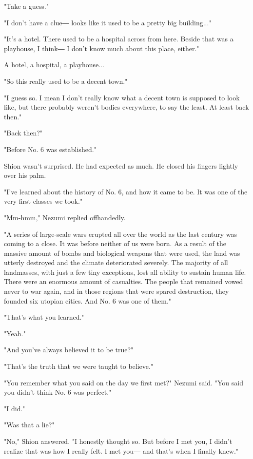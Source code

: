 "Take a guess."

"I don't have a clue― looks like it used to be a pretty big building..."

"It's a hotel. There used to be a hospital across from here. Beside that
was a playhouse, I think― I don't know much about this place, either."

A hotel, a hospital, a playhouse...

"So this really used to be a decent town."

"I guess so. I mean I don't really know what a decent town is supposed
to look like, but there probably weren't bodies everywhere, to say the
least. At least back then."

"Back then?"

"Before No. 6 was established."

Shion wasn't surprised. He had expected as much. He closed his fingers
lightly over his palm.

"I've learned about the history of No. 6, and how it came to be. It was
one of the very first classes we took."

"Mm-hmm," Nezumi replied offhandedly.

"A series of large-scale wars erupted all over the world as the last
century was coming to a close. It was before neither of us were born. As
a result of the massive amount of bombs and biological weapons that were
used, the land was utterly destroyed and the climate deteriorated
severely. The majority of all landmasses, with just a few tiny
exceptions, lost all ability to sustain human life. There were an
enormous amount of casualties. The people that remained vowed never to
war again, and in those regions that were spared destruction, they
founded six utopian cities. And No. 6 was one of them."

"That's what you learned."

"Yeah."

"And you've always believed it to be true?"

"That's the truth that we were taught to believe."

"You remember what you said on the day we first met?" Nezumi said. "You
said you didn't think No. 6 was perfect."

"I did."

"Was that a lie?"

"No," Shion answered. "I honestly thought so. But before I met you, I
didn't realize that was how I really felt. I met you― and that's when I
finally knew."

